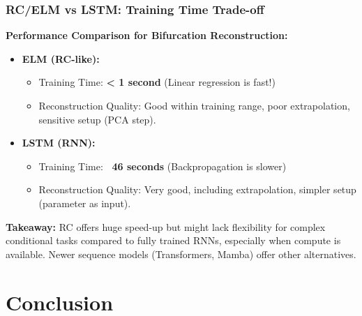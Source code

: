 \documentclass{beamer}
\begin{document}
\begin{frame}
    \frametitle{RC/ELM vs LSTM: Training Time Trade-off}
    \textbf{Performance Comparison for Bifurcation Reconstruction:}
    \begin{itemize}
        \item \textbf{ELM (RC-like):}
            \begin{itemize}
                \item Training Time: \textbf{< 1 second} (Linear regression is fast!)
                \item Reconstruction Quality: Good within training range, poor extrapolation, sensitive setup (PCA step).
            \end{itemize}
        \pause
        \item \textbf{LSTM (RNN):}
            \begin{itemize}
                \item Training Time: \textbf{~46 seconds} (Backpropagation is slower)
                \item Reconstruction Quality: Very good, including extrapolation, simpler setup (parameter as input).
            \end{itemize}
    \end{itemize}
    \pause
    \textbf{Takeaway:} RC offers huge speed-up but might lack flexibility for complex conditional tasks compared to fully trained RNNs, especially when compute is available. Newer sequence models (Transformers, Mamba) offer other alternatives.
\end{frame}

\section{Conclusion}
\end{document}
